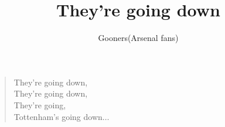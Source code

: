 \documentclass[a4paper,12pt]{article}
\title{They're going down}
\author{Gooners(Arsenal fans)}
\date{}
\begin{document}
	
	\maketitle
	
	\begin{verse}
		
		They're going down, \\
		They're going down, \\
		They're going, \\
		Tottenham's going down$\ldots$
		
	\end{verse}
	
\end{document}

